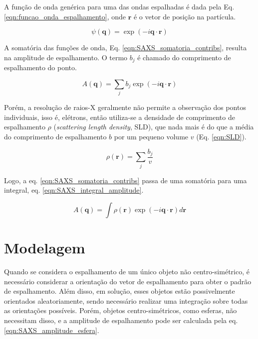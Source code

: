 		A função de onda genérica para uma das ondas espalhadas é dada pela Eq. \ref{eqn:funcao_onda_espalhamento}, onde \(\mathbf{r}\) é o vetor de posição na partícula. 
		
		\begin{equation}
			\psi(\mathbf{q}) = \exp(-i \mathbf{q} \cdot \mathbf{r})
			\label{eqn:funcao_onda_espalhamento}
		\end{equation}
		
		A somatória das funções de onda, Eq. \ref{eqn:SAXS_somatoria_contribs}, resulta na amplitude de espalhamento. O termo \(b_j\) é chamado do comprimento de espalhamento do ponto.
		
		\begin{equation}
			A(\mathbf{q}) = \sum_j b_j \exp(-i \mathbf{q} \cdot \mathbf{r})
			\label{eqn:SAXS_somatoria_contribs}
		\end{equation}
		
		Porém, a resolução de raios-X geralmente não permite a observação dos pontos individuais, isso é, elétrons, então utiliza-se a densidade de comprimento de espalhamento \(\rho\) (\emph{scattering length density}, SLD), que nada mais é do que a média do comprimento de espalhamento \(b\) por um pequeno volume \(v\) (Eq. \ref{eqn:SLD}).
		
		\begin{equation}
			\rho(\mathbf{r}) = \sum_j \dfrac{b_j}{v}
			\label{eqn:SLD}
		\end{equation}
		
		Logo, a eq. \ref{eqn:SAXS_somatoria_contribs} passa de uma somatória para uma integral, eq. \ref{eqn:SAXS_integral_amplitude}.
		
		\begin{equation}
			A(\mathbf{q}) = \int \rho(\mathbf{r}) \exp(-i \mathbf{q} \cdot \mathbf{r}) d\mathbf{r}
			\label{eqn:SAXS_integral_amplitude}
		\end{equation}
		
		\section{Modelagem}
		
		Quando se considera o espalhamento de um único objeto não centro-simétrico, é necessário considerar a orientação do vetor de espalhamento \q{} para obter o padrão de espalhamento. Além disso, em solução, esses objetos estão possivelmente orientados aleatoriamente, sendo necessário realizar uma integração sobre todas as orientações possíveis. Porém, objetos centro-simétricos, como esferas, não necessitam disso, e a amplitude de espalhamento pode ser calculada pela eq. \ref{eqn:SAXS_amplitude_esfera}. 
		
